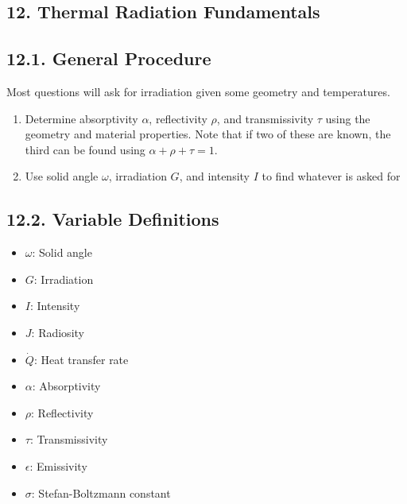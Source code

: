 \begin{multicols*}{2}
\section*{12. Thermal Radiation Fundamentals}
\subsection*{12.1. General Procedure}
Most questions will ask for irradiation given some geometry and temperatures.
\begin{enumerate}
    \item Determine absorptivity $\alpha$, reflectivity $\rho$, and transmissivity $\tau$ using the geometry and material properties. 
    Note that if two of these are known, the third can be found using $\alpha + \rho + \tau = 1$.
    \item Use solid angle $\omega$, irradiation $G$, and intensity $I$ to find whatever is asked for
\end{enumerate}
\subsection*{12.2. Variable Definitions}
\begin{itemize}
    \item $\omega$: Solid angle
    \item $G$: Irradiation
    \item $I$: Intensity
    \item $J$: Radiosity
    \item $\dot{Q}$: Heat transfer rate
    \item $\alpha$: Absorptivity
    \item $\rho$: Reflectivity
    \item $\tau$: Transmissivity
    \item $\epsilon$: Emissivity
    \item $\sigma$: Stefan-Boltzmann constant
\end{itemize}


\end{multicols*}
